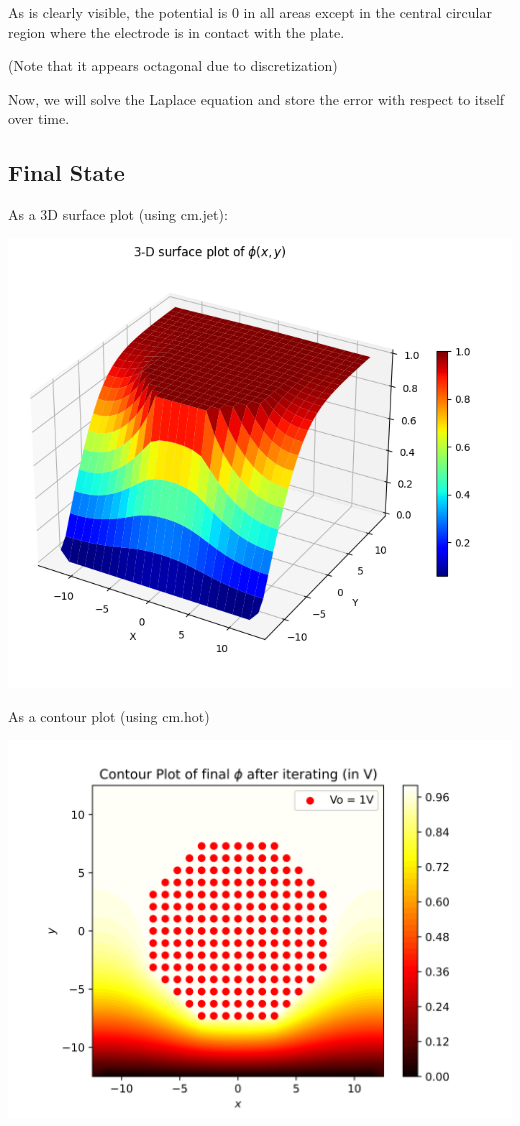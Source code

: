 \documentclass[12pt]{article}
\begin{document}
\normalsize
As is clearly visible, the potential is 0 in all areas except in the central circular region where the electrode is in contact with the plate.

(Note that it appears octagonal due to discretization)

Now, we will solve the Laplace equation and store the error with respect to itself over time.
\pagebreak
\subsection{Final State}

As a 3D surface plot (using cm.jet):
\begin{center}
    \includegraphics{images/fig4_2.png}
\end{center}
\pagebreak
As a contour plot (using cm.hot)
\begin{center}
    \includegraphics{images/fig5.png}
\end{center}
\pagebreak
\end{document}
